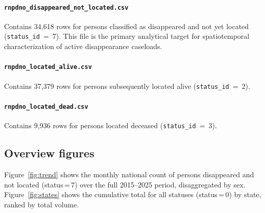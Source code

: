 \documentclass[3p]{elsarticle}
\begin{document}
  \paragraph{\texttt{rnpdno\_disappeared\_not\_located.csv}}                                                                                                                                
  Contains 34{,}618 rows for persons classified as disappeared and
  not yet located (\texttt{status\_id}~=~7).                                                                                                                                                  
  This file is the primary analytical target for
  spatiotemporal characterization of active disappearance caseloads.                                                                                                                          
                                                                                                                                                                                            
  \paragraph{\texttt{rnpdno\_located\_alive.csv}}                                                                                                                                             
  Contains 37{,}379 rows for persons subsequently located alive
  (\texttt{status\_id}~=~2).                                                                                                                                                                  
                                                                                                                                                                                            
  \paragraph{\texttt{rnpdno\_located\_dead.csv}}
  Contains 9{,}936 rows for persons located deceased
  (\texttt{status\_id}~=~3).                                                                  
  

\subsection*{Overview figures}

Figure~\ref{fig:trend} shows the monthly national count of persons
disappeared and not located (status\,=\,7) over the full 2015--2025
period, disaggregated by sex.
Figure~\ref{fig:states} shows the cumulative total for all statuses
(status\,=\,0) by state, ranked by total volume.
\end{document}
